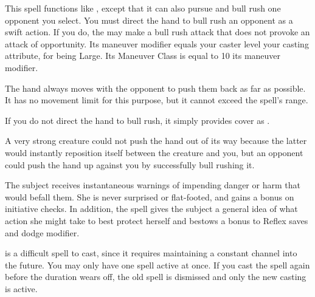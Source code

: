 \begin{spelleffect}
  This spell functions like , except that it can also pursue and bull rush one opponent you select. You must direct the hand to bull rush an opponent as a swift action. If you do, the  may make a bull rush attack that does not provoke an attack of opportunity. Its maneuver modifier equals your caster level \add your casting attribute,  for being Large. Its Maneuver Class is equal to 10 \add its maneuver modifier.
  \par The hand always moves with the opponent to push them back as far as possible. It has no movement limit for this purpose, but it cannot exceed the spell's range.
  \par If you do not direct the hand to bull rush, it simply provides cover as .
\end{spelleffect}
\begin{spellnotes}
  A very strong creature could not push the hand out of its way because the latter would instantly reposition itself between the creature and you, but an opponent could push the hand up against you by successfully bull rushing it.
\end{spellnotes}

\begin{spelleffect}
  The subject receives instantaneous warnings of impending danger or harm that would befall them. She is never surprised or flat-footed, and gains a  bonus on initiative checks. In addition, the spell gives the subject a general idea of what action she might take to best protect herself and bestows a  bonus to Reflex saves and dodge modifier.
\end{spelleffect}
\begin{spellnotes}
   is a difficult spell to cast, since it requires maintaining a constant channel into the future. You may only have one  spell active at once. If you cast the spell again before the duration wears off, the old spell is dismissed and only the new casting is active. 
\end{spellnotes}

